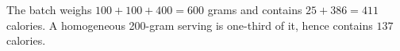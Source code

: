 The batch weighs $100+100+400=600$ grams and contains $25+386=411$ calories. A homogeneous 200-gram serving is one-third of it, hence contains $\boxed{137}$ calories.
